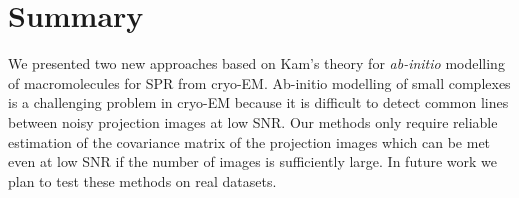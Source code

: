 \documentclass{article}
\begin{document}
 
\section{Summary}
We presented two new approaches based on Kam's theory for {\em ab-initio} modelling of macromolecules for SPR from cryo-EM.  
Ab-initio modelling of small complexes is a challenging problem in cryo-EM because it is difficult to detect common lines between noisy projection images at low SNR.
Our methods only require reliable estimation of the covariance matrix of the projection images which can be met even at low SNR if the number of images is sufficiently large.    
In future work we plan to test these methods on real datasets.




\end{document}
